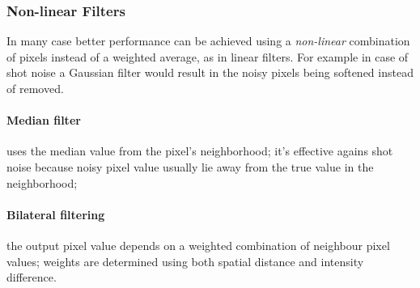 \documentclass[a4paper,twocolumn]{article}
\begin{document}
\subsubsection{Non-linear Filters}
In many case better performance can be achieved using a \textit{non-linear}
combination of pixels instead of a weighted average, as in linear filters. For
example in case of shot noise a Gaussian filter would result in the noisy pixels
being softened instead of removed.
\paragraph{Median filter} uses the median value from the pixel's neighborhood;
it's effective agains shot noise because noisy pixel value usually lie away from
the true value in the neighborhood;
\paragraph{Bilateral filtering} the output pixel value depends on a weighted
combination of neighbour pixel values; weights are determined using both spatial
distance and intensity difference.
\end{document}
